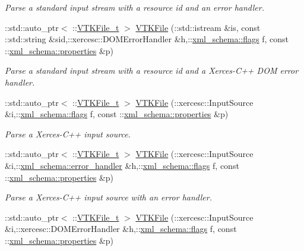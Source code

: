 \begin{DoxyCompactItemize}
\begin{DoxyCompactList}\small\item\em Parse a standard input stream with a resource id and an error handler. \end{DoxyCompactList}\item 
\+::std\+::auto\+\_\+ptr$<$ \+::\hyperlink{classVTKFile__t}{V\+T\+K\+File\+\_\+t} $>$ \hyperlink{vtk-unstructured_8cpp_a814cb20ccb515a7b632f0c321294e689}{V\+T\+K\+File} (\+::std\+::istream \&is, const \+::std\+::string \&sid,\+::xercesc\+::\+D\+O\+M\+Error\+Handler \&h,\+::\hyperlink{namespacexml__schema_a8d981c127a1f5106d04ad5853e707361}{xml\+\_\+schema\+::flags} f, const \+::\hyperlink{namespacexml__schema_aba199bc39c8b21c427369c27d2bcfc8c}{xml\+\_\+schema\+::properties} \&p)
\begin{DoxyCompactList}\small\item\em Parse a standard input stream with a resource id and a Xerces-\/\+C++ D\+O\+M error handler. \end{DoxyCompactList}\item 
\+::std\+::auto\+\_\+ptr$<$ \+::\hyperlink{classVTKFile__t}{V\+T\+K\+File\+\_\+t} $>$ \hyperlink{vtk-unstructured_8cpp_a5fced37b23830aa750d1b8d2c961ddd4}{V\+T\+K\+File} (\+::xercesc\+::\+Input\+Source \&i,\+::\hyperlink{namespacexml__schema_a8d981c127a1f5106d04ad5853e707361}{xml\+\_\+schema\+::flags} f, const \+::\hyperlink{namespacexml__schema_aba199bc39c8b21c427369c27d2bcfc8c}{xml\+\_\+schema\+::properties} \&p)
\begin{DoxyCompactList}\small\item\em Parse a Xerces-\/\+C++ input source. \end{DoxyCompactList}\item 
\+::std\+::auto\+\_\+ptr$<$ \+::\hyperlink{classVTKFile__t}{V\+T\+K\+File\+\_\+t} $>$ \hyperlink{vtk-unstructured_8cpp_adf4d4d420188c2ec3cf7ecf194c0db9a}{V\+T\+K\+File} (\+::xercesc\+::\+Input\+Source \&i,\+::\hyperlink{namespacexml__schema_abdee01986b8e16f04af47dd12038261e}{xml\+\_\+schema\+::error\+\_\+handler} \&h,\+::\hyperlink{namespacexml__schema_a8d981c127a1f5106d04ad5853e707361}{xml\+\_\+schema\+::flags} f, const \+::\hyperlink{namespacexml__schema_aba199bc39c8b21c427369c27d2bcfc8c}{xml\+\_\+schema\+::properties} \&p)
\begin{DoxyCompactList}\small\item\em Parse a Xerces-\/\+C++ input source with an error handler. \end{DoxyCompactList}\item 
\+::std\+::auto\+\_\+ptr$<$ \+::\hyperlink{classVTKFile__t}{V\+T\+K\+File\+\_\+t} $>$ \hyperlink{vtk-unstructured_8cpp_a05320585fc9be971c331447b76c0d14b}{V\+T\+K\+File} (\+::xercesc\+::\+Input\+Source \&i,\+::xercesc\+::\+D\+O\+M\+Error\+Handler \&h,\+::\hyperlink{namespacexml__schema_a8d981c127a1f5106d04ad5853e707361}{xml\+\_\+schema\+::flags} f, const \+::\hyperlink{namespacexml__schema_aba199bc39c8b21c427369c27d2bcfc8c}{xml\+\_\+schema\+::properties} \&p)

\end{DoxyCompactItemize}

